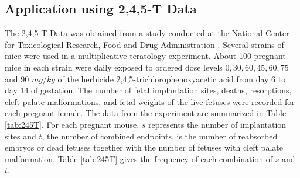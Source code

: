 \documentclass[12pt,oneside]{report}
\theoremstyle{definition}
\theoremstyle{mystyle}
\begin{document}
\subsection{Application using 2,4,5-T Data}
\vspace{5mm}
The 2,4,5-T Data was obtained from a study conducted at the National Center for Toxicological Research, Food and Drug Administration \cite{bg}. Several strains of mice were used in a multiplicative teratology experiment. About  100 pregnant mice in each strain were
daily exposed to ordered dose  levels $0,30,60,45,60,75 $ and $90$ $mg/kg$ of the herbicide 2,4,5-trichlorophenoxyacetic acid  from day 6 to day 14 of gestation. The  number of fetal implantation sites, deaths, resorptions, cleft palate malformations, and fetal weights of the live fetuses were recorded for each pregnant female.  The data from the experiment are summarized in Table \ref{tab:245T}. For each pregnant mouse, $s$ represents the number of implantation sites and $t$, the number of combined endpoints, is the number of reabsorbed embryos or dead fetuses together with the number of fetuses with cleft palate malformation. Table \ref{tab:245T} gives the frequency of each combination of $s$ and $t$.






\newpage
\end{document}
